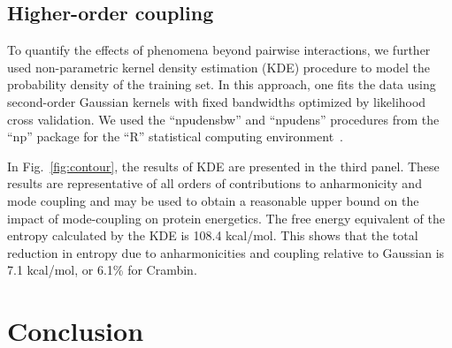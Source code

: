 \documentclass[12pt,article]{iopart}
\begin{document}
\subsection{Higher-order coupling}

To quantify the effects of phenomena beyond pairwise interactions, we
further used non-parametric kernel density estimation (KDE) procedure
to model the probability density of the training set.  In this
approach, one fits the data using second-order Gaussian kernels with
fixed bandwidths optimized by likelihood cross validation.  We used
the ``npudensbw'' and ``npudens'' procedures from the ``np'' package
for the ``R'' statistical computing environment~\cite{hayfield2008nonparametric}.

In Fig.~\ref{fig:contour}, the results of KDE are presented in the
third panel.  These results are representative of all orders of
contributions to anharmonicity and mode coupling and may be used to
obtain a reasonable upper bound on the impact of mode-coupling on
protein energetics.  The free energy equivalent of the entropy
calculated by the KDE is 108.4 kcal/mol.  This shows that the total
reduction in entropy due to anharmonicities and coupling relative to
Gaussian is 7.1 kcal/mol, or 6.1\% for Crambin.

\section{Conclusion}
\end{document}
